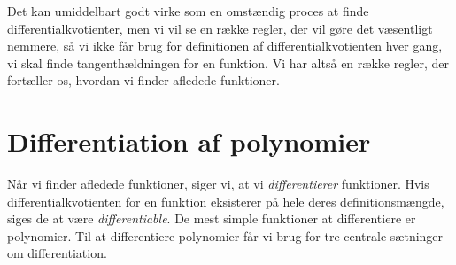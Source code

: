 Det kan umiddelbart godt virke som en omstændig proces at finde differentialkvotienter, men vi vil se en række regler, der vil gøre det væsentligt nemmere, så vi ikke får brug for definitionen af differentialkvotienten hver gang, vi skal finde tangenthældningen for en funktion. Vi har altså en række regler, der fortæller os, hvordan vi finder afledede funktioner. 
\section*{Differentiation af polynomier}

Når vi finder afledede funktioner, siger vi, at vi \textit{differentierer} funktioner. Hvis differentialkvotienten for en funktion eksisterer på hele deres definitionsmængde, siges de at være \textit{differentiable}. De mest simple funktioner at differentiere er polynomier. Til at differentiere polynomier får vi brug for tre centrale sætninger om differentiation. 

